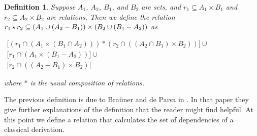\documentclass{article}
\newtheorem{definition}[theorem]{Definition}
\begin{document}
\begin{definition}
  \label{def:gen-rel-comp}
  Suppose $A_1$, $A_2$, $B_1$, and $B_2$ are sets, and $r_1 \subseteq
  A_1 \times B_1$ and $r_2 \subseteq A_2 \times B_2$ are relations.
  Then we define the relation $r_1 \mathop{\star} r_2 \subseteq (A_1
  \cup (A_2 - B_1)) \times (B_2 \cup (B_1 - A_2))$ as 
  \begin{center}
    \begin{math}
      \begin{array}{lll}
        \lbrack (r_1 \cap (A_1 \times (B_1 \cap A_2))) * (r_2 \cap
        ((A_2 \cap B_1) \times B_2))\rbrack \cup \\
        \lbrack r_1 \cap (A_1 \times (B_1 - A_2))\rbrack \cup \\
        \lbrack r_2 \cap ((A_2 - B_1) \times B_2) \rbrack
      \end{array}
    \end{math}
  \end{center}
  where $*$ is the usual composition of relations.
\end{definition}
The previous definition is due to Bra\"uner and de Paiva in
\cite{Brauner:1998}.  In that paper they give further explanations of
the definition that the reader might find helpful.  At this point we
define a relation that calculates the set of dependencies of a
classical derivation.  
\end{document}

